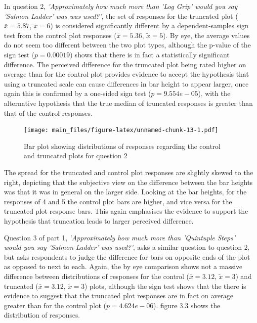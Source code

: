 \documentclass[
  11pt,
]{book}
\begin{document}
In question 2,
\textit{'Approximately how much more than 'Log Grip' would you say 'Salmon Ladder' was was used?'},
the set of responses for the truncated plot (\(\bar{x} = 5.87\),
\(\tilde{x} = 6\)) is considered significantly different by a
dependent-samples sign test from the control plot responses
(\(\bar{x} = 5.36\), \(\tilde{x} = 5\)). By eye, the average values do
not seem too different between the two plot types, although the p-value
of the sign test (\(p = 0.00019\)) shows that there is in fact a
statistically significant difference. The perceived difference for the
truncated plot being rated higher on average than for the control plot
provides evidence to accept the hypothesis that using a truncated scale
can cause differences in bar height to appear larger, once again this is
confirmed by a one-sided sign test (\(p=9.554e-05\)), with the
alternative hypothesis that the true median of truncated responses is
greater than that of the control responses.

\begin{figure}
\centering
\texttt{[image: main\_files/figure-latex/unnamed-chunk-13-1.pdf]}
\caption{Bar plot showing distributions of responses regarding the
control and truncated plots for question 2}
\end{figure}

The spread for the truncated and control plot responses are slightly
skewed to the right, depicting that the subjective view on the
difference between the bar heights was that it was in general on the
larger side. Looking at the bar heights, for the responses of 4 and 5
the control plot bars are higher, and vice versa for the truncated plot
response bars. This again emphasises the evidence to support the
hypothesis that truncation leads to larger perceived difference.

Question 3 of part 1,
\textit{'Approximately how much more than 'Quintuple Steps' would you say 'Salmon Ladder' was used?'},
asks a similar question to question 2, but asks respondents to judge the
difference for bars on opposite ends of the plot as opposed to next to
each. Again, the by eye comparison shows not a massive difference
between distributions of responses for the control (\(\bar{x}=3.12\),
\(\tilde{x}=3\)) and truncated (\(\bar{x}=3.12\), \(\tilde{x}=3\))
plots, although the sign test shows that the there is evidence to
suggest that the truncated plot responses are in fact on average greater
than for the control plot (\(p=4.624e-06\)). figure 3.3 shows the
distribution of responses.
\end{document}
